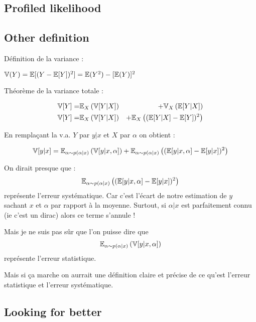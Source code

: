 \subsection{Profiled likelihood} %
\label{sub:profiled_likelihood}



\subsection{Other definition} %
\label{sub:other_definition}

Définition de la variance :

$\mathbb{V}(Y) = \mathbb{E}[(Y - \mathbb{E}[Y])^2] = \mathbb{E}(Y^2) - [\mathbb{E}(Y)]^2$

Théorème de la variance totale \needcite :

\begin{eqnarray}
    \mathbb{V}[Y] =& \mathbb{E}_X \left (\mathbb{V}[Y|X] \right ) &+ \mathbb{V}_X \left (\mathbb{E}[Y|X]\right ) \\
    \mathbb{V}[Y] =& \mathbb{E}_X \left (\mathbb{V}[Y|X] \right ) &+ \mathbb{E}_X \left ( (\mathbb{E} [Y|X]  - \mathbb{E}[Y])^2\right )
\end{eqnarray}


En remplaçant la v.a. $Y$ par $y|x$ et $X$ par $\alpha$ on obtient :

$$
\mathbb{V}[y|x] = \mathbb{E}_{\alpha \sim p(\alpha|x)} \left (\mathbb{V}[y|x, \alpha] \right ) + \mathbb{E}_{\alpha \sim p(\alpha|x)} \left ( (\mathbb{E} [y|x, \alpha]  - \mathbb{E}[y|x])^2\right )
$$


On dirait presque que : 
$$\mathbb{E}_{\alpha \sim p(\alpha|x)} \left ((\mathbb{E} [y|x, \alpha]  - \mathbb{E}[y|x])^2\right )$$
représente l'erreur systématique. 
Car c'est l'écart de notre estimation de $y$ sachant $x$ et $\alpha$ par rapport à la moyenne.
Surtout, si $\alpha|x$ est parfaitement connu (ie c'est un dirac) alors ce terme s'annule !

Mais je ne suis pas sûr que l'on puisse dire que
$$\mathbb{E}_{\alpha \sim p(\alpha|x)} \left (\mathbb{V}[y|x, \alpha] \right )$$
représente l'erreur statistique.

Mais si ça marche on aurrait une définition claire et précise de ce qu'est l'erreur statistique et l'erreur systématique.


\subsection{Looking for better} %
\label{sub:looking_for_better}




